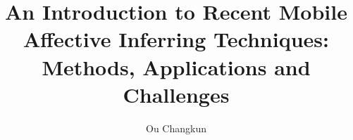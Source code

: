 \documentclass[journal]{vgtc}
\title{An Introduction to Recent Mobile Affective Inferring Techniques: \\Methods, Applications and Challenges}
\author{Ou Changkun}
\begin{document}
\maketitle








\nocite{*}
\printbibliography
\end{document}
